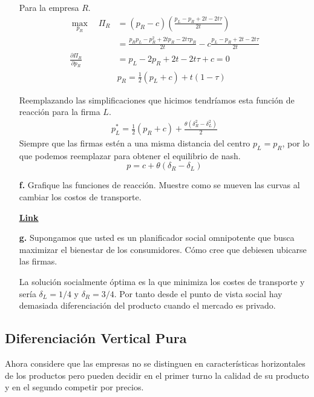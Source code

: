 \documentclass{exam}
\begin{document}
\begin{enumerate}
\begin{solution}
Para la empresa $R$.
\begin{align*}
    \max_{p_R} \quad \Pi_R &= (p_R-c) \left( \frac{p_L-p_R +2t -2t\tau}{2t}   \right) \\
    & = \frac{p_Rp_L - p_R^2 +2tp_R-2t\tau p_R}{2t} - c \frac{p_L-p_R +2t -2t\tau}{2t} \\
    \frac{\partial \Pi_R}{\partial p_R} & = p_L -2p_R+2t-2t\tau +c = 0 \\
    & \boxed{p_R = \frac{1}{2}(p_L + c) + t(1-\tau)}
\end{align*}

Reemplazando las simplificaciones que hicimos tendríamos esta función de reacción para la firma $L$.
\begin{align*}
    p_L^* = \frac{1}{2}(p_R+c) + \frac{\theta(\delta_R^2 -\delta_L^2)}{2}
\end{align*}
Siempre que las firmas estén a una misma distancia del centro $p_L = p_R$, por lo que podemos reemplazar para obtener el equilibrio de nash. 
\begin{equation*}
    p = c + \theta(\delta_R - \delta_L)
\end{equation*}
    \end{solution}
    \item[\textbf{f.}] Grafique las funciones de reacción. Muestre como se mueven las curvas al cambiar los costos de transporte.  
    \begin{solution}
        \textbf{ \href{https://www.geogebra.org/calculator/bv9nzjae}{\underline{Link}}}
    \end{solution}
    \item[\textbf{g.}] Supongamos que usted es un planificador social omnipotente que busca maximizar el bienestar de los consumidores. Cómo cree que debiesen ubicarse las firmas.
    \begin{solution}
        La solución socialmente óptima es la que minimiza los costes de transporte y sería $\delta_L=1/4$ y $\delta_R=3/4$. Por tanto desde el punto de vista social hay demasiada diferenciación del producto cuando el mercado es privado.
    \end{solution}
\end{enumerate}

\subsection{Diferenciación Vertical Pura}

Ahora considere que las empresas no se distinguen en características horizontales de los productos pero pueden decidir en el primer turno la calidad de su producto y en el segundo competir por precios. \vspace{3mm}
\end{document}
